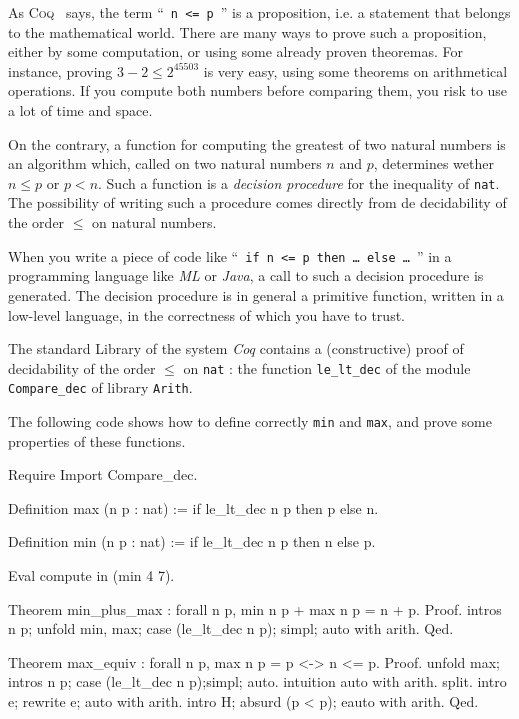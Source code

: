 \documentclass[a4paper,pdftex]{article}
\def\Coq{\textsc{Coq}}
\begin{document}
As \Coq~ says, the term ``~\texttt{n <= p}~'' is a proposition, i.e. a
statement that belongs to the mathematical world. There are many ways to
prove such a proposition, either by some computation, or using some already
proven theoremas. For instance, proving $3-2 \leq 2^{45503}$ is very easy,
using some theorems on arithmetical operations. If you compute both numbers
before comparing them, you risk to use a lot of time and space.


On the contrary, a function for computing the greatest of two natural numbers
is an algorithm  which, called on two natural numbers
$n$ and $p$, determines wether $n\leq p$ or $p < n$.
Such a function is a \emph{decision  procedure} for the inequality of
 \texttt{nat}.  The possibility of writing such a procedure comes 
directly from de decidability of the order $\leq$ on natural numbers.


When you write a piece of code like 
``~\texttt{if n <= p then \dots{} else \dots}~''
in a
programming language like \emph{ML} or \emph{Java}, a call to such a 
decision procedure is generated. The decision procedure is in general
a primitive function, written in a low-level language, in the correctness
of which you have to trust.

The standard Library of the system \emph{Coq} contains a  
(constructive) proof of decidability of the order $\leq$ on
\texttt{nat} : the function \texttt{le\_lt\_dec} of 
the module \texttt{Compare\_dec} of library \texttt{Arith}.

The following code shows how to define correctly \texttt{min} and
\texttt{max}, and prove some properties of these functions.

\begin{coq_example}
Require Import Compare_dec.

Definition max (n p : nat) := if le_lt_dec n p then p else n.

Definition min (n p : nat) := if le_lt_dec n p then n else p.

Eval compute in (min 4 7).

Theorem min_plus_max : forall n p, min n p + max n p  = n + p.
Proof.
 intros n p; 
 unfold min, max; 
 case (le_lt_dec n p);
 simpl; auto with arith.
Qed.

Theorem max_equiv : forall n p, max n p = p <-> n <= p.
Proof.
 unfold max; intros n p; case (le_lt_dec n p);simpl; auto.
 intuition auto with arith.
 split. 
 intro e; rewrite e; auto with arith.
 intro H; absurd (p < p); eauto with arith.
Qed.
\end{coq_example}
\end{document}
